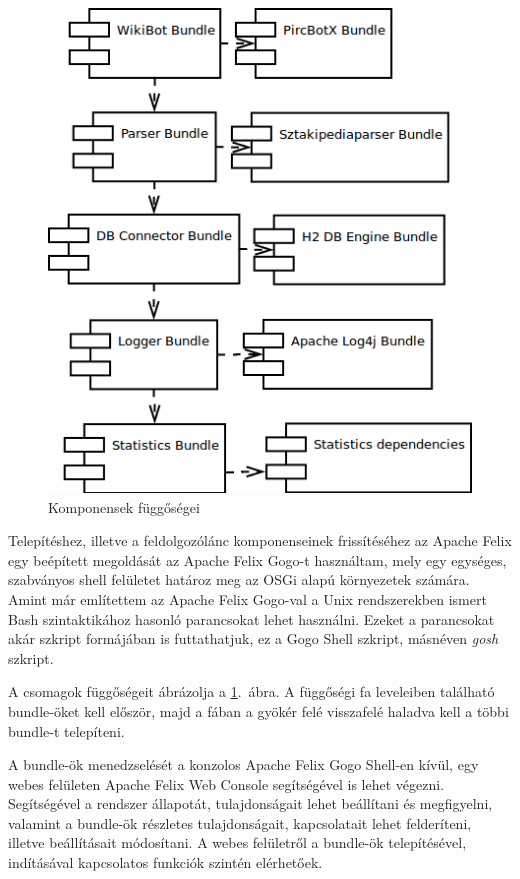 \begin{figure}[htp]
\centering
\includegraphics[scale=0.4]{img/deploymentdependency}
\caption{Komponensek függőségei}
\label{fig:deploymentdependency}
\end{figure}

Telepítéshez, illetve a feldolgozólánc komponenseinek frissítéséhez az Apache Felix egy beépített megoldását az Apache Felix Gogo-t használtam, mely egy egységes, szabványos shell felületet határoz meg az OSGi alapú környezetek számára. Amint már említettem az Apache Felix Gogo-val a Unix rendszerekben ismert Bash szintaktikához hasonló parancsokat lehet használni. Ezeket a parancsokat akár szkript formájában is futtathatjuk, ez a Gogo Shell szkript, másnéven \textit{gosh} szkript.

A csomagok függőségeit ábrázolja a \ref{fig:deploymentdependency}.~ábra. A függőségi fa leveleiben található bundle-öket kell először, majd a fában a gyökér felé visszafelé haladva kell a többi bundle-t telepíteni.

A bundle-ök menedzselését a konzolos Apache Felix Gogo Shell-en kívül, egy webes felületen Apache Felix Web Console segítségével is lehet végezni. Segítségével a rendszer állapotát, tulajdonságait lehet beállítani és megfigyelni, valamint a bundle-ök részletes tulajdonságait, kapcsolatait lehet felderíteni, illetve beállításait módosítani. A webes felületről a bundle-ök telepítésével, indításával kapcsolatos funkciók szintén elérhetőek.

